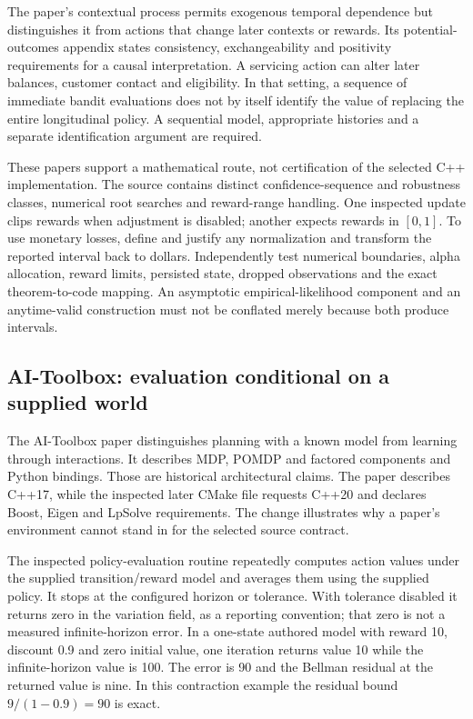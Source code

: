 The paper's contextual process permits exogenous temporal dependence but distinguishes it from actions that change later contexts or rewards. Its potential-outcomes appendix states consistency, exchangeability and positivity requirements for a causal interpretation. A servicing action can alter later balances, customer contact and eligibility. In that setting, a sequence of immediate bandit evaluations does not by itself identify the value of replacing the entire longitudinal policy. A sequential model, appropriate histories and a separate identification argument are required.~\citep{exec24_policycxx_anytime2024,exec24_policycxx_comparison}

These papers support a mathematical route, not certification of the selected C++ implementation. The source contains distinct confidence-sequence and robustness classes, numerical root searches and reward-range handling. One inspected update clips rewards when adjustment is disabled; another expects rewards in $[0,1]$. To use monetary losses, define and justify any normalization and transform the reported interval back to dollars. Independently test numerical boundaries, alpha allocation, reward limits, persisted state, dropped observations and the exact theorem-to-code mapping. An asymptotic empirical-likelihood component and an anytime-valid construction must not be conflated merely because both produce intervals.~\citep{exec24_policycxx_vw,exec24_policycxx_cs2021,exec24_policycxx_anytime2024,exec24_policycxx_comparison}

\subsection{AI-Toolbox: evaluation conditional on a supplied world}
The AI-Toolbox paper distinguishes planning with a known model from learning through interactions. It describes MDP, POMDP and factored components and Python bindings. Those are historical architectural claims. The paper describes C++17, while the inspected later CMake file requests C++20 and declares Boost, Eigen and LpSolve requirements. The change illustrates why a paper's environment cannot stand in for the selected source contract.~\citep{exec24_policycxx_aitoolbox_paper,exec24_policycxx_aitoolbox}

The inspected policy-evaluation routine repeatedly computes action values under the supplied transition/reward model and averages them using the supplied policy. It stops at the configured horizon or tolerance. With tolerance disabled it returns zero in the variation field, as a reporting convention; that zero is not a measured infinite-horizon error. In a one-state authored model with reward 10, discount 0.9 and zero initial value, one iteration returns value 10 while the infinite-horizon value is 100. The error is 90 and the Bellman residual at the returned value is nine. In this contraction example the residual bound $9/(1-0.9)=90$ is exact.~\citep{exec24_policycxx_aitoolbox,exec24_policycxx_comparison}

